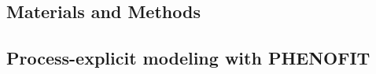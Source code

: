 \documentclass[letterpaper,8pt]{extarticle}  %
\begin{document}
\begin{doublespacing}
\begin{linenumbers}






\section{Materials and Methods}

\subsection{Process-explicit modeling with PHENOFIT}


\end{linenumbers}
\end{doublespacing}
\end{document}
